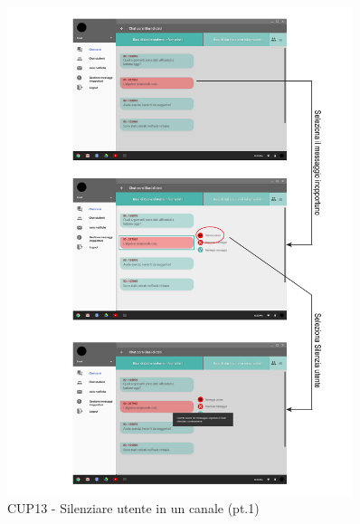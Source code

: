 \begin{figure}
	\centering
	\includegraphics[width=0.9\textwidth]{imgs/gruppo6/activities/act_cup13_silenziare_utente1.pdf}
	\caption{CUP13 - Silenziare utente in un canale (pt.1)}
	\label{fig:act-cup13}
\end{figure}

